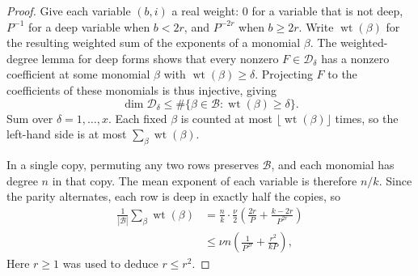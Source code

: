 \begin{proof}
Give each variable $(b,i)$ a real weight: $0$ for a variable that is not deep, $P^{-1}$ for a deep variable when $b<2r$, and $P^{-2r}$ when $b\ge2r$. Write $\operatorname{wt}(\beta)$ for the resulting weighted sum of the exponents of a monomial $\beta$. The weighted-degree lemma for deep forms shows that every nonzero $F\in\mathcal D_\delta$ has a nonzero coefficient at some monomial $\beta$ with $\operatorname{wt}(\beta)\ge\delta$. Projecting $F$ to the coefficients of these monomials is thus injective, giving
\[
 \dim\mathcal D_\delta
 \le \#\{\beta\in\mathcal B:\operatorname{wt}(\beta)\ge\delta\}.
\]
Sum over $\delta=1,\ldots,x$. Each fixed $\beta$ is counted at most $\lfloor\operatorname{wt}(\beta)\rfloor$ times, so the left-hand side is at most $\sum_\beta\operatorname{wt}(\beta)$.

In a single copy, permuting any two rows preserves $\mathcal B$, and each monomial has degree $n$ in that copy. The mean exponent of each variable is therefore $n/k$. Since the parity alternates, each row is deep in exactly half the copies, so
\[
 \begin{aligned}
 \frac1{|\mathcal B|}\sum_\beta\operatorname{wt}(\beta)
   &=\frac nk\cdot\frac{\nu}{2}
       \left(\frac{2r}{P}+\frac{k-2r}{P^{2r}}\right)\\
   &\le \nu n\left(\frac1{P^{2r}}+\frac{r^2}{kP}\right),
 \end{aligned}
\]
Here $r\ge1$ was used to deduce $r\le r^2$.
\end{proof}

